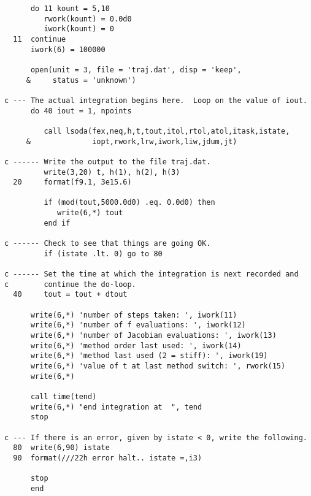 {\begin{lstlisting}
      do 11 kount = 5,10
         rwork(kount) = 0.0d0
         iwork(kount) = 0
  11  continue
      iwork(6) = 100000
	  
	  open(unit = 3, file = 'traj.dat', disp = 'keep',
     &     status = 'unknown')
	 
c --- The actual integration begins here.  Loop on the value of iout.
      do 40 iout = 1, npoints
	  
         call lsoda(fex,neq,h,t,tout,itol,rtol,atol,itask,istate,
     &              iopt,rwork,lrw,iwork,liw,jdum,jt)
	  
c ------ Write the output to the file traj.dat.
         write(3,20) t, h(1), h(2), h(3)
  20     format(f9.1, 3e15.6)

         if (mod(tout,5000.0d0) .eq. 0.0d0) then
            write(6,*) tout
         end if
  
c ------ Check to see that things are going OK.
         if (istate .lt. 0) go to 80
		 
c ------ Set the time at which the integration is next recorded and
c        continue the do-loop.
  40     tout = tout + dtout
  
      write(6,*) 'number of steps taken: ', iwork(11)
      write(6,*) 'number of f evaluations: ', iwork(12)
      write(6,*) 'number of Jacobian evaluations: ', iwork(13)
      write(6,*) 'method order last used: ', iwork(14)
      write(6,*) 'method last used (2 = stiff): ', iwork(19)
      write(6,*) 'value of t at last method switch: ', rwork(15)
      write(6,*)
	 
	  call time(tend)
	  write(6,*) "end integration at  ", tend
      stop
	  
c --- If there is an error, given by istate < 0, write the following.
  80  write(6,90) istate
  90  format(///22h error halt.. istate =,i3)
  
      stop
      end

\end{lstlisting}
}
